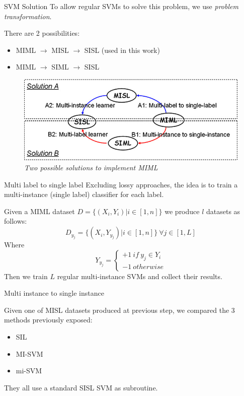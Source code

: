 \begin{frame}{SVM Solution}
	To allow regular SVMs to solve this problem, we use \textit{problem transformation}.
	
	There are 2 possibilities:
	\begin{itemize}
		\item MIML $\rightarrow$ MISL $\rightarrow$ SISL (used in this work)
		\item MIML $\rightarrow$ SIML $\rightarrow$ SISL
	\end{itemize}
	\begin{figure}[htbp]
		\centering
		\includegraphics[scale = 0.40]{./images/2-metodi.png}
		\caption{\textit{Two possible solutions to implement MIML}}
	\end{figure}
\end{frame}

\begin{frame}{Multi label to single label}
	Excluding lossy approaches, the idea is to train a multi-instance (single label) classifier for each label.
	
	Given a MIML dataset $D = \{(X_i, Y_i) | i \in [1, n]\}$	we produce $l$ datasets as follows:
	$$D_{y_j} = \{(X_i, Y_{y_j}) | i \in [1, n]\} \ \forall j \in [1, L]$$
	Where
	$$Y_{y_j} = 
	\begin{cases}
		+1 \ if \ y_j \in Y_i \\
		-1 \ otherwise
	\end{cases}$$
	Then we train $L$ regular multi-instance SVMs and collect their results.
\end{frame}

\begin{frame}{Multi instance to single instance}

	Given one of MISL datasets produced at previous step, we compared the 3 methods previously exposed:
	\begin{itemize}
		\item SIL
		\item MI-SVM
		\item mi-SVM
	\end{itemize}
	
	They all use a standard SISL SVM as subroutine.
\end{frame}

